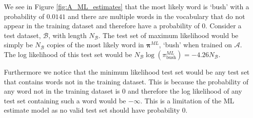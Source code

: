 \documentclass[11pt]{article}
\begin{document}
We see in Figure \ref{fig:A_ML_estimates} that the most likely word is `bush' with a probability of $0.0141$ and there are multiple words in the vocabulary that do not appear in the training dataset and therefore have a probability of $0$. Consider a test dataset, $\mathcal{B}$, with length $N_{\mathcal{B}}$. The test set of maximum likelihood would be simply be $N_{\mathcal{B}}$ copies of the most likely word in $\boldsymbol{\pi}^{ML}$, `bush' when trained on $\mathcal{A}$. The log likelihood of this test set would be $N_{\mathcal{B}} \log(\pi_{\text{bush}}^{ML}) = -4.26 N_{\mathcal{B}}$.

Furthermore we notice that the minimum likelihood test set would be any test set that contains words not in the training dataset. This is because the probability of any word not in the training dataset is $0$ and therefore the log likelihood of any test set containing such a word would be $-\infty$. This is a limitation of the ML estimate model as no valid test set should have probability $0$.
\end{document}
